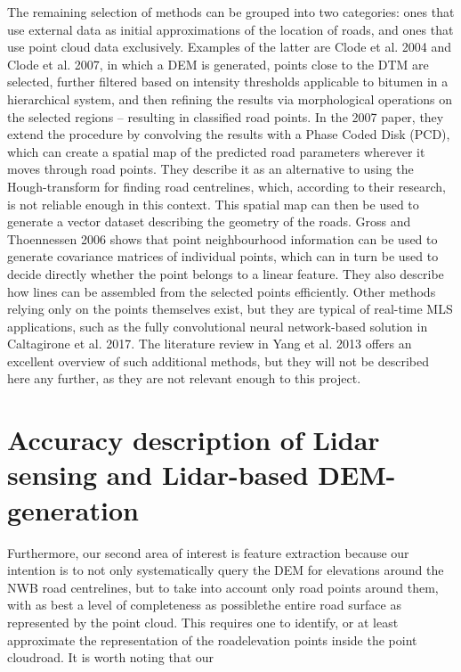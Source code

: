 The remaining selection of methods can be grouped into two categories: ones that use external data as initial approximations of the location of roads, and ones that use point cloud data exclusively.  Examples of the latter are Clode et al. 2004 and Clode et al. 2007, in which a DEM is generated, points close to the DTM are selected, further filtered based on intensity thresholds applicable to bitumen in a hierarchical system, and then refining the results via morphological operations on the selected regions – resulting in classified road points. In the 2007 paper, they extend the procedure by convolving the results with a Phase Coded Disk (PCD), which can create a spatial map of the predicted road parameters wherever it moves through road points. They describe it as an alternative to using the Hough-transform for finding road centrelines, which, according to their research, is not reliable enough in this context. This spatial map can then be used to generate a vector dataset describing the geometry of the roads. Gross and Thoennessen 2006 shows that point neighbourhood information can be used to generate covariance matrices of individual points, which can in turn be used to decide directly whether the point belongs to a linear feature. They also describe how lines can be assembled from the selected points efficiently. Other methods relying only on the points themselves exist, but they are typical of real-time MLS applications, such as the fully convolutional neural network-based solution in Caltagirone et al. 2017. The literature review in Yang et al. 2013 offers an excellent overview of such additional methods, but they will not be described here any further, as they are not relevant enough to this project.


\section*{Accuracy description of Lidar sensing and Lidar-based DEM-generation}

Furthermore, our second area of interest is feature extraction because our intention is to not only systematically query the DEM for elevations around the NWB road centrelines, but to take into account only road points around them, with as best a level of completeness as possiblethe entire road surface as represented by the point cloud. This requires one to identify, or at least approximate the representation of the roadelevation points inside the point cloudroad. It is worth noting that our
